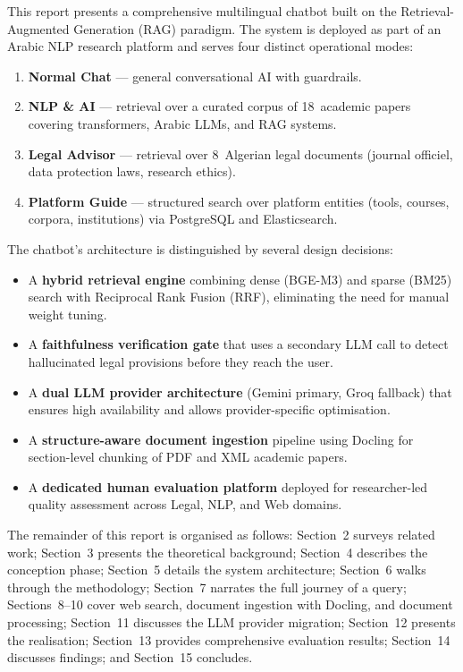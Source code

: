 \documentclass[12pt, a4paper]{article}
\begin{document}
This report presents a comprehensive multilingual chatbot built on the
Retrieval-Augmented Generation (RAG) paradigm. The system is deployed as part
of an Arabic NLP research platform and serves four distinct operational modes:

\begin{enumerate}[leftmargin=2em]
  \item \textbf{Normal Chat} --- general conversational AI with guardrails.
  \item \textbf{NLP \& AI} --- retrieval over a curated corpus of 18~academic
        papers covering transformers, Arabic LLMs, and RAG systems.
  \item \textbf{Legal Advisor} --- retrieval over 8~Algerian legal
        documents (journal officiel, data protection laws, research ethics).
  \item \textbf{Platform Guide} --- structured search over platform entities
        (tools, courses, corpora, institutions) via PostgreSQL and
        Elasticsearch.
\end{enumerate}

The chatbot's architecture is distinguished by several design decisions:
\begin{itemize}[leftmargin=2em]
  \item A \textbf{hybrid retrieval engine} combining dense (BGE-M3) and sparse
        (BM25) search with Reciprocal Rank Fusion (RRF), eliminating the need
        for manual weight tuning.
  \item A \textbf{faithfulness verification gate} that uses a secondary LLM
        call to detect hallucinated legal provisions before they reach the user.
  \item A \textbf{dual LLM provider architecture} (Gemini primary, Groq
        fallback) that ensures high availability and allows provider-specific
        optimisation.
  \item A \textbf{structure-aware document ingestion} pipeline using Docling
        for section-level chunking of PDF and XML academic papers.
  \item A \textbf{dedicated human evaluation platform} deployed for
        researcher-led quality assessment across Legal, NLP, and Web domains.
\end{itemize}

The remainder of this report is organised as follows: Section~2 surveys related
work; Section~3 presents the theoretical background; Section~4 describes the
conception phase; Section~5 details the system architecture; Section~6 walks
through the methodology; Section~7 narrates the full journey of a query;
Sections~8--10 cover web search, document ingestion with Docling, and document
processing; Section~11 discusses the LLM provider migration; Section~12
presents the realisation; Section~13 provides comprehensive evaluation results;
Section~14 discusses findings; and Section~15 concludes.
\end{document}
